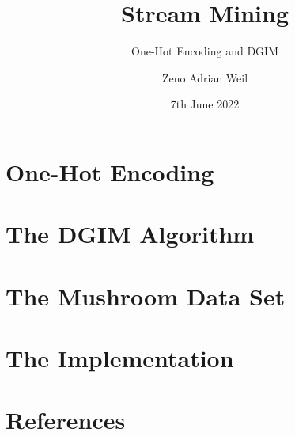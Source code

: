 \documentclass[
	9pt,
	a4paper,
	handout
]{beamer}
\title{Stream Mining}
\subtitle{One-Hot Encoding and DGIM}
\author{Zeno Adrian Weil}
\institute{Data Science 1 \\ Goethe University Frankfurt}
\date{7th June 2022}
\begin{document}
	\begin{frame}[plain]
		\titlepage
	\end{frame}

	\section{One-Hot Encoding}
	

	\section{The DGIM Algorithm}
	
	
	\section{The Mushroom Data Set}
	
	
	\section{The Implementation}
	

	\section{References}
	
\end{document}

